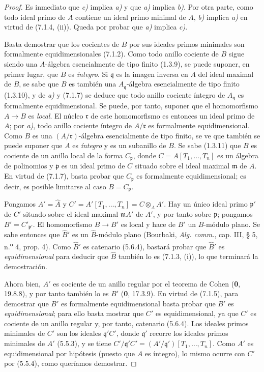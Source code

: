 \begin{proof}
Es inmediato que \emph{c)} implica \emph{a)} y que \emph{a)} implica \emph{b)}.
Por otra parte, como todo ideal primo de $A$ contiene
un ideal primo minimal de $A$, \emph{b)} implica \emph{a)} en virtud
de (7.1.4, (ii)). Queda por probar que \emph{a)} implica \emph{c)}.

Basta demostrar que los cocientes de $B$ por sus ideales
primos minimales son formalmente equidimensionales
(7.1.2). Como todo anillo cociente de $B$ sigue siendo
una $A$-álgebra esencialmente de tipo finito (1.3.9),
se puede suponer, en primer lugar, que $B$ es
\emph{íntegro}. Si $\mathfrak q$ es la imagen inversa
en $A$ del ideal maximal de $B$, se sabe que $B$ es
también una $A_{\mathfrak q}$-álgebra esencialmente
de tipo finito (1.3.10), y de \emph{a)} y (7.1.7) se deduce
que todo anillo cociente íntegro de $A_{\mathfrak q}$
es formalmente equidimensional. Se puede, por tanto,
suponer que el homomorfismo $A\to B$ es \emph{local}.
El núcleo $\mathfrak r$ de este homomorfismo es
entonces un ideal primo de $A$; por \emph{a)}, todo anillo
cociente íntegro de $A/\mathfrak r$ es formalmente
equidimensional. Como $B$ es una
$(A/\mathfrak r)$-álgebra esencialmente de tipo
finito, se ve que también se puede suponer
que $A$ es \emph{íntegro} y es un subanillo de $B$.
Se sabe (1.3.11) que $B$ es cociente de un anillo
local de la forma $C_{\mathfrak p}$, donde
$C=A[T_1,\ldots,T_n]$ es un álgebra de polinomios
y $\mathfrak p$ es un ideal primo de $C$ situado
sobre el ideal maximal $\mathfrak m$ de $A$.
En virtud de (7.1.7), basta probar que
$C_{\mathfrak p}$ es formalmente equidimensional;
es decir, es posible limitarse al caso
$B=C_{\mathfrak p}$.

Pongamos $A'=\widehat A$ y
$C'=A'[T_1,\ldots,T_n]=C\otimes_AA'$.
Hay un único ideal primo $\mathfrak p'$ de $C'$
situado sobre el ideal maximal $\mathfrak mA'$ de
$A'$, y por tanto sobre $\mathfrak p$; pongamos
$B'=C'_{\mathfrak p'}$. El homomorfismo
$B\to B'$ es local y hace de $B'$ un $B$-módulo
plano. Se sabe entonces que $\widehat{B}'$ es
un $\widehat B$-módulo plano (Bourbaki,
\emph{Alg. comm.}, cap. III, § 5,
n.\textsuperscript{o} 4, prop. 4).
Como $\widehat{B}'$ es catenario (5.6.4),
bastará probar que $\widehat{B}'$ es
\emph{equidimensional} para deducir que
$\widehat B$ también lo es (7.1.3, (i)),
lo que terminará la demostración.

Ahora bien, $A'$ es cociente de un anillo regular
por el teorema de Cohen (\textbf{0}, 19.8.8), y por tanto
también lo es $B'$ (\textbf 0, 17.3.9). En virtud de
(7.1.5), para demostrar que $B'$ es formalmente
equidimensional basta probar que $B'$ es
\emph{equidimensional}; para ello basta mostrar que
$C'$ es equidimensional, ya que $C'$ es cociente
de un anillo regular y, por tanto, catenario
(5.6.4). Los ideales primos minimales de $C'$
son los ideales $\mathfrak q'C'$, donde
$\mathfrak q'$ recorre los ideales primos minimales
de $A'$ (5.5.3), y se tiene
$C'/\mathfrak q'C'=(A'/\mathfrak q')[T_1,\ldots,T_n]$.
Como $A'$ es equidimensional por hipótesis
(puesto que $A$ es íntegro), lo mismo ocurre
con $C'$ por (5.5.4), como queríamos demostrar.
\end{proof}
